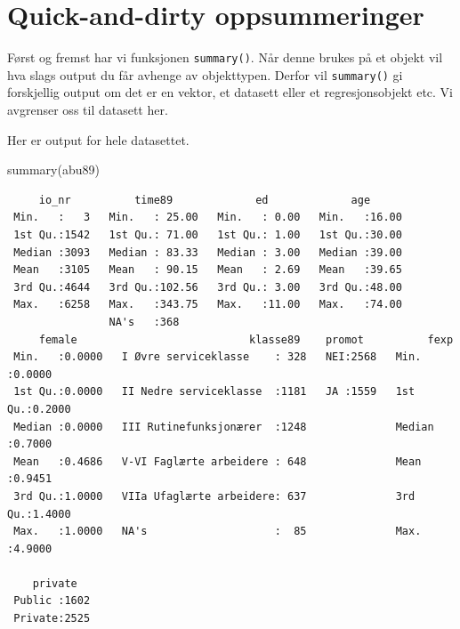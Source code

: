 \documentclass[
  letterpaper,
  DIV=11,
  numbers=noendperiod]{scrreprt}
\newenvironment{Shaded}{\begin{snugshade}}{\end{snugshade}}
\newcommand{\FunctionTok}[1]{\textcolor[rgb]{0.28,0.35,0.67}{#1}}
\newcommand{\NormalTok}[1]{\textcolor[rgb]{0.00,0.23,0.31}{#1}}
\theoremstyle{definition}
\theoremstyle{remark}
\begin{document}
\hypertarget{quick-and-dirty-oppsummeringer}{%
\section{Quick-and-dirty
oppsummeringer}\label{quick-and-dirty-oppsummeringer}}

Først og fremst har vi funksjonen \texttt{summary()}. Når denne brukes
på et objekt vil hva slags output du får avhenge av objekttypen. Derfor
vil \texttt{summary()} gi forskjellig output om det er en vektor, et
datasett eller et regresjonsobjekt etc. Vi avgrenser oss til datasett
her.

Her er output for hele datasettet.

\begin{Shaded}
\begin{Highlighting}[]
\FunctionTok{summary}\NormalTok{(abu89)}
\end{Highlighting}
\end{Shaded}

\begin{verbatim}
     io_nr          time89             ed             age       
 Min.   :   3   Min.   : 25.00   Min.   : 0.00   Min.   :16.00  
 1st Qu.:1542   1st Qu.: 71.00   1st Qu.: 1.00   1st Qu.:30.00  
 Median :3093   Median : 83.33   Median : 3.00   Median :39.00  
 Mean   :3105   Mean   : 90.15   Mean   : 2.69   Mean   :39.65  
 3rd Qu.:4644   3rd Qu.:102.56   3rd Qu.: 3.00   3rd Qu.:48.00  
 Max.   :6258   Max.   :343.75   Max.   :11.00   Max.   :74.00  
                NA's   :368                                     
     female                           klasse89    promot          fexp       
 Min.   :0.0000   I Øvre serviceklasse    : 328   NEI:2568   Min.   :0.0000  
 1st Qu.:0.0000   II Nedre serviceklasse  :1181   JA :1559   1st Qu.:0.2000  
 Median :0.0000   III Rutinefunksjonærer  :1248              Median :0.7000  
 Mean   :0.4686   V-VI Faglærte arbeidere : 648              Mean   :0.9451  
 3rd Qu.:1.0000   VIIa Ufaglærte arbeidere: 637              3rd Qu.:1.4000  
 Max.   :1.0000   NA's                    :  85              Max.   :4.9000  
                                                                             
    private    
 Public :1602  
 Private:2525  
               
               
               
               
               
\end{verbatim}
\end{document}
